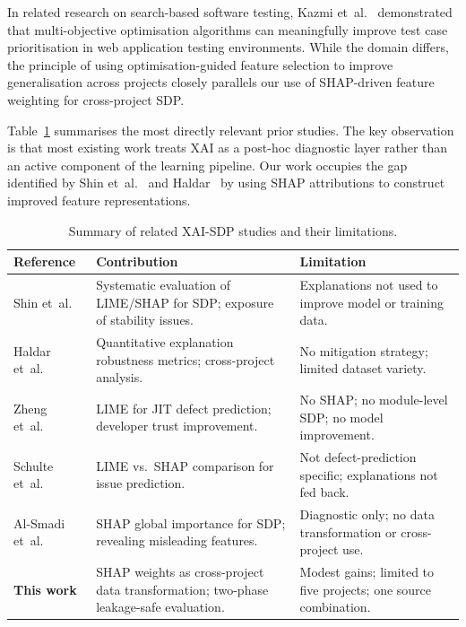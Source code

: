 \documentclass[12pt, a4paper]{article}
\begin{document}
In related research on search-based software testing, Kazmi et~al.\
\cite{kazmi2022,kazmi2021,kazmi2020} demonstrated that multi-objective
optimisation algorithms can meaningfully improve test case prioritisation in
web application testing environments. While the domain differs, the principle
of using optimisation-guided feature selection to improve generalisation
across projects closely parallels our use of SHAP-driven feature weighting
for cross-project SDP.

Table~\ref{tab:rw} summarises the most directly relevant prior studies.
The key observation is that most existing work treats XAI as a post-hoc
diagnostic layer rather than an active component of the learning pipeline.
Our work occupies the gap identified by Shin et~al.~\cite{shin2021} and
Haldar~\cite{haldar2024} by using SHAP attributions to construct improved
feature representations.

\begin{table}[H]
\caption{Summary of related XAI-SDP studies and their limitations.}
\label{tab:rw}
\centering
\footnotesize
\setlength{\tabcolsep}{4pt}
\renewcommand{\arraystretch}{1.25}
\begin{tabularx}{\textwidth}{@{}p{28mm}XX@{}}
\toprule
\textbf{Reference} & \textbf{Contribution} & \textbf{Limitation} \\
\midrule
Shin et~al.~\cite{shin2021}
  & Systematic evaluation of LIME/SHAP for SDP; exposure of stability issues.
  & Explanations not used to improve model or training data. \\

Haldar et~al.~\cite{haldar2023}
  & Quantitative explanation robustness metrics; cross-project analysis.
  & No mitigation strategy; limited dataset variety. \\

Zheng et~al.~\cite{zheng2022}
  & LIME for JIT defect prediction; developer trust improvement.
  & No SHAP; no module-level SDP; no model improvement. \\

Schulte et~al.~\cite{schulte2024}
  & LIME vs.\ SHAP comparison for issue prediction.
  & Not defect-prediction specific; explanations not fed back. \\

Al-Smadi et~al.~\cite{alsmadi2023}
  & SHAP global importance for SDP; revealing misleading features.
  & Diagnostic only; no data transformation or cross-project use. \\

\textbf{This work}
  & SHAP weights as cross-project data transformation; two-phase leakage-safe evaluation.
  & Modest gains; limited to five projects; one source combination. \\
\bottomrule
\end{tabularx}
\end{table}
\end{document}

